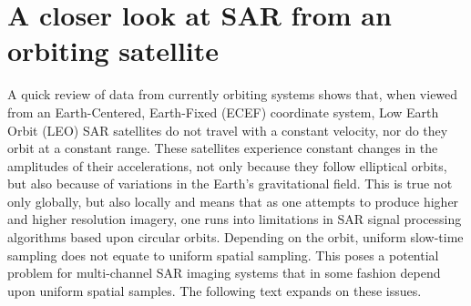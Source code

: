 \section{A closer look at SAR from an orbiting satellite}
A quick review of data from currently orbiting systems shows that, when viewed from an Earth-Centered, Earth-Fixed (ECEF) coordinate system, Low Earth Orbit (LEO) SAR satellites do not travel with a constant velocity, nor do they orbit at a constant range. These satellites experience constant changes in the amplitudes of their accelerations, not only because they follow elliptical orbits, but also because of variations in the Earth's gravitational field. This is true not only globally, but also locally and means that as one attempts to produce higher and higher resolution imagery, one runs into limitations in SAR signal processing algorithms based upon circular orbits. Depending on the orbit, uniform slow-time sampling does not equate to uniform spatial sampling. This poses a potential problem for multi-channel SAR imaging systems that in some fashion depend upon uniform spatial samples. The following text expands on these issues.
